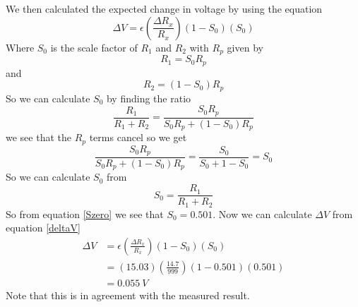 \documentclass[11pt]{article}
\numberwithin{equation}{section}
\begin{document}
We then calculated the expected change in voltage by using the equation
\begin{equation}
\Delta V = \epsilon\left(\frac{\Delta R_x}{R_x}\right)(1-S_0)(S_0) 
\label{deltaV}
\end{equation}
Where $S_0$ is the scale factor of $R_1$ and $R_2$ with $R_p$ given by
$$R_1 = S_0R_p$$ 
and
$$R_2 = (1-S_0)R_p$$ 
So we can calculate $S_0$ by finding the ratio
$$\frac{R_1}{R_1+R_2} = \frac{S_0R_p}{S_0R_p+(1-S_0)R_p}$$
we see that the $R_p$ terms cancel so we get
$$\frac{S_0R_p}{S_0R_p+(1-S_0)R_p} = \frac{S_0}{S_0+1-S_0} = S_0$$
So we can calculate $S_0$ from
\begin{equation}
S_0 = \frac{R_1}{R_1+R_2}
\label{Szero}
\end{equation}
So from equation \ref{Szero} we see that $S_0 = 0.501$. Now we can calculate $\Delta V$ from equation \ref{deltaV}
\begin{align*}
\Delta V &= \epsilon\left(\frac{\Delta R_x}{R_x}\right)(1-S_0)(S_0) \\
&= (15.03)\left(\frac{14.7}{999}\right)(1-0.501)(0.501) \\
&= 0.055\ V
\end{align*}
Note that this is in agreement with the measured result.
\end{document}
